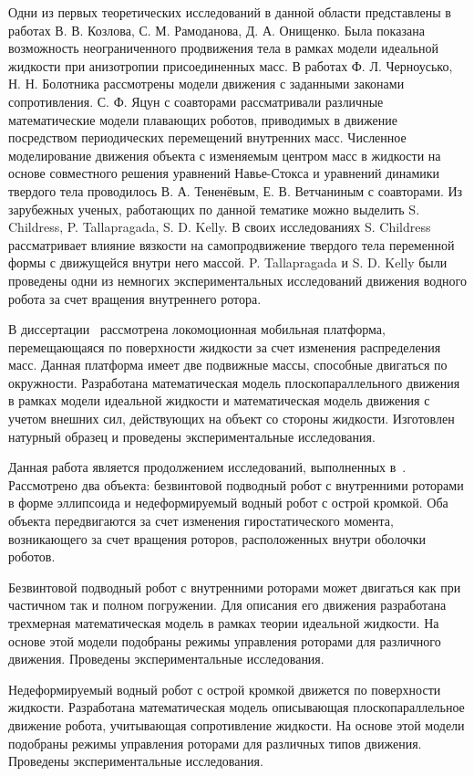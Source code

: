 Одни из первых теоретических исследований в данной области представлены в работах В. В. Козлова, С. М. Рамоданова, Д. А. Онищенко. Была показана возможность неограниченного продвижения тела в рамках модели идеальной жидкости при анизотропии присоединенных масс. В работах Ф. Л. Черноусько, Н. Н. Болотника рассмотрены модели движения с заданными законами сопротивления. С. Ф. Яцун с соавторами рассматривали различные математические модели плавающих роботов, приводимых в движение посредством периодических перемещений внутренних масс. Численное моделирование движения объекта с изменяемым центром масс в жидкости на основе совместного решения уравнений Навье-Стокса и уравнений динамики твердого тела проводилось В. А. Тененёвым, Е. В. Ветчаниным с соавторами. Из зарубежных ученых, работающих по данной тематике можно выделить S. Childress, P. Tallapragada, S. D. Kelly. В своих исследованиях S. Childress рассматривает влияние вязкости на самопродвижение твердого тела переменной формы с движущейся внутри него массой. P. Tallapragada и S. D. Kelly были проведены одни из немногих экспериментальных исследований движения водного робота за счет вращения внутреннего ротора.

В диссертации~\cite{Klenov_diss} рассмотрена локомоционная мобильная платформа, перемещающаяся по поверхности жидкости за счет изменения распределения масс. Данная платформа имеет две подвижные массы, способные двигаться по окружности. Разработана математическая модель плоскопараллельного движения в рамках модели идеальной жидкости и математическая модель движения с учетом внешних сил, действующих на объект со стороны жидкости. Изготовлен натурный образец и проведены экспериментальные исследования.

Данная работа является продолжением исследований, выполненных в~\cite{Klenov_diss}. Рассмотрено два объекта: безвинтовой подводный робот с внутренними роторами в форме эллипсоида и недеформируемый водный робот с острой кромкой. Оба объекта передвигаются за счет изменения гиростатического момента, возникающего за счет вращения роторов, расположенных внутри оболочки роботов.
 
Безвинтовой подводный робот с внутренними роторами может двигаться как при частичном так и полном погружении. Для описания его движения разработана трехмерная математическая модель в рамках теории идеальной жидкости. На основе этой модели подобраны режимы управления роторами для различного движения. Проведены экспериментальные исследования.

Недеформируемый водный робот с острой кромкой движется по поверхности жидкости. Разработана математическая модель описывающая плоскопараллельное движение робота, учитывающая сопротивление жидкости. На основе этой модели подобраны режимы управления роторами для различных типов движения. Проведены экспериментальные исследования.


